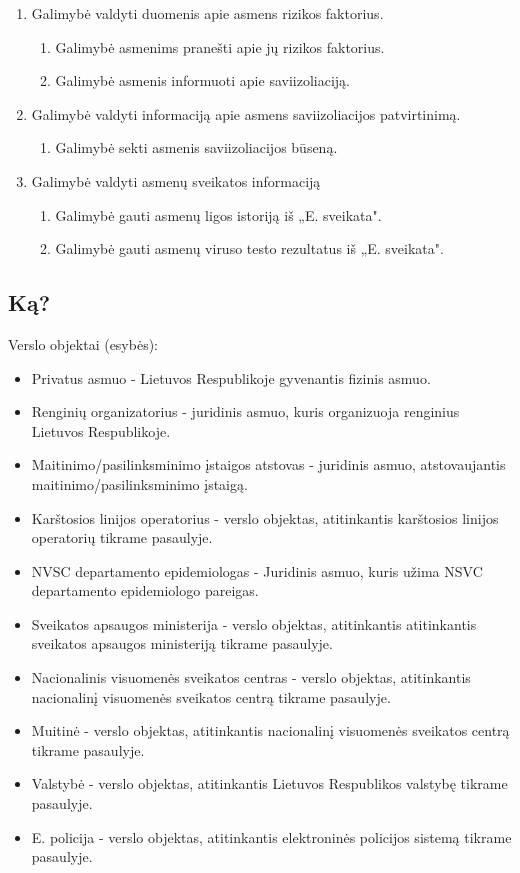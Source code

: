 \documentclass{VUMIFPSkursinis}
\begin{document}
\begin{enumerate}
\begin{enumerate}
	      \end{enumerate}
	\item{Galimybė valdyti duomenis apie asmens rizikos faktorius.}
	      \begin{enumerate}
		      \item{Galimybė asmenims pranešti apie jų rizikos faktorius.}
		      \item{Galimybė asmenis informuoti apie saviizoliaciją.}
	      \end{enumerate}
	\item{Galimybė valdyti informaciją apie asmens saviizoliacijos patvirtinimą.}
	      \begin{enumerate}
		      \item{Galimybė sekti asmenis saviizoliacijos būseną.}
	      \end{enumerate}
	\item{Galimybė valdyti asmenų sveikatos informaciją}
	      \begin{enumerate}
		      \item{Galimybė gauti asmenų ligos istoriją iš „E. sveikata".}
		      \item{Galimybė gauti asmenų viruso testo rezultatus iš „E. sveikata".}
	      \end{enumerate}
\end{enumerate}

\subsection{Ką?}

Verslo objektai (esybės):
\begin{itemize}
	\item Privatus asmuo - Lietuvos Respublikoje gyvenantis fizinis asmuo.
	\item Renginių organizatorius - juridinis asmuo, kuris organizuoja renginius Lietuvos Respublikoje.
	\item Maitinimo/pasilinksminimo įstaigos atstovas - juridinis asmuo, atstovaujantis maitinimo/pasilinksminimo įstaigą.
	\item Karštosios linijos operatorius - verslo objektas, atitinkantis karštosios linijos operatorių tikrame pasaulyje.
	\item NVSC departamento epidemiologas - Juridinis asmuo, kuris užima NSVC departamento epidemiologo pareigas.
	\item Sveikatos apsaugos ministerija - verslo objektas, atitinkantis atitinkantis sveikatos apsaugos ministeriją tikrame pasaulyje.
	\item Nacionalinis visuomenės sveikatos centras - verslo objektas, atitinkantis nacionalinį visuomenės sveikatos centrą tikrame pasaulyje.
	\item Muitinė - verslo objektas, atitinkantis nacionalinį visuomenės sveikatos centrą tikrame pasaulyje.
	\item Valstybė - verslo objektas, atitinkantis Lietuvos Respublikos valstybę tikrame pasaulyje.
	\item E. policija - verslo objektas, atitinkantis elektroninės policijos sistemą tikrame pasaulyje.
\end{itemize}
\end{document}

